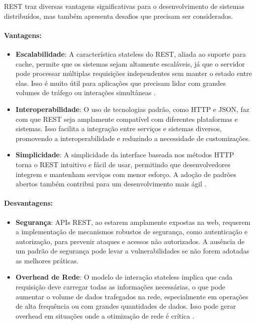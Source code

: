 \documentclass[12pt]{article}
\begin{document}
	REST traz diversas vantagens significativas para o desenvolvimento de sistemas distribuídos, mas também apresenta desafios que precisam ser considerados.
	
	\paragraph{Vantagens:}
	\begin{itemize}
		\item \textbf{Escalabilidade}: A característica stateless do REST, aliada ao suporte para cache, permite que os sistemas sejam altamente escaláveis, já que o servidor pode processar múltiplas requisições independentes sem manter o estado entre elas. Isso é muito útil para aplicações que precisam lidar com grandes volumes de tráfego ou interações simultâneas \cite{cavaleiro2013}.
		
		\item \textbf{Interoperabilidade}: O uso de tecnologias padrão, como HTTP e JSON, faz com que REST seja amplamente compatível com diferentes plataformas e sistemas. Isso facilita a integração entre serviços e sistemas diversos, promovendo a interoperabilidade e reduzindo a necessidade de customizações.
		
		\item \textbf{Simplicidade}: A simplicidade da interface baseada nos métodos HTTP torna o REST intuitivo e fácil de usar, permitindo que desenvolvedores integrem e mantenham serviços com menor esforço. A adoção de padrões abertos também contribui para um desenvolvimento mais ágil \cite{newcomer2002}.
	\end{itemize}
	
	\paragraph{Desvantagens:}
	\begin{itemize}
		\item \textbf{Segurança}: APIs REST, ao estarem amplamente expostas na web, requerem a implementação de mecanismos robustos de segurança, como autenticação e autorização, para prevenir ataques e acessos não autorizados. A ausência de um padrão de segurança pode levar a vulnerabilidades se não forem adotadas as melhores práticas.
		
		\item \textbf{Overhead de Rede}: O modelo de interação stateless implica que cada requisição deve carregar todas as informações necessárias, o que pode aumentar o volume de dados trafegados na rede, especialmente em operações de alta frequência ou com grandes quantidades de dados. Isso pode gerar overhead em situações onde a otimização de rede é crítica \cite{fielding2000}.
	\end{itemize}
	
\end{document}
